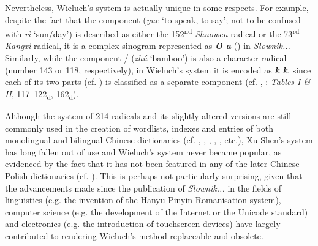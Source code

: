 \documentclass[output=paper,colorlinks,citecolor=brown,arabicfont,chinesefont]{langscibook}
\begin{document}
Nevertheless, Wieluch's system is actually unique in some respects. For example, despite the fact that the component {} (\emph{yuē} ‘to speak, to say’; not to be confused with {} \emph{rì} ‘sun/day’) is described as either the 152\textsuperscript{nd} \emph{Shuowen} radical or the 73\textsuperscript{rd} \emph{Kangxi} radical, it is a complex sinogram represented as \textbf{\emph{O a}} ({}) in \emph{Słownik...} Similarly, while the component {}/{} (\emph{zhú} ‘bamboo’) is also a character radical (number 143 or 118, respectively), in Wieluch's system it is encoded as \textbf{\emph{k k}}, since each of its two parts (cf. ) is classified as a separate component (cf. \citealt{[HD]}, \citealt{Wieluch1936}: \emph{Tables I \& II}, 117–122\textsubscript{d}, 162\textsubscript{d}).

Although the system of 214 radicals and its slightly altered versions are still commonly used in the creation of wordlists, indexes and entries of both monolingual and bilingual Chinese dictionaries (cf. \citealt{Xia_Chen_2009}, \citealt{XuYao_2010}, \citealt{Kocyba-grychKolecka2012}, \citealt{Achinger2023}, \citealt{[HD]}, \citealt{[MDBG]} etc.), Xu Shen's system has long fallen out of use and Wieluch's system never became popular, as evidenced by the fact that it has not been featured in any of the later Chinese-Polish dictionaries (cf. \citealt{Sroka-gradziel2018}). This is perhaps not particularly surprising, given that the advancements made since the publication of \emph{Słownik...} in the fields of linguistics (e.g. the invention of the Hanyu Pinyin Romanisation system), computer science (e.g. the development of the Internet or the Unicode standard) and electronics (e.g. the introduction of touchscreen devices) have largely contributed to rendering Wieluch's method replaceable and obsolete.
\end{document}
